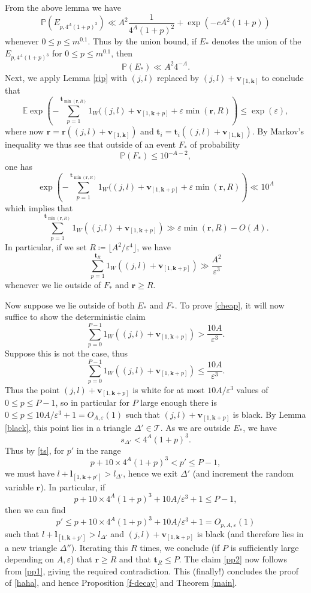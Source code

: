 \documentclass[12pt,a4paper,reqno]{amsart}
\numberwithin{equation}{section}
\theoremstyle{plain}
\theoremstyle{definition}
\renewcommand\P{\mathbb{P}}
\newcommand\E{\mathbb{E}}
\renewcommand\k{\mathbf{k}}
\renewcommand\v{\mathbf{v}}
\renewcommand\t{\mathbf{t}}
\renewcommand\r{\mathbf{r}}
\renewcommand\l{\mathbf{l}}
\newcommand\eps{\varepsilon}
\begin{document}
From the above lemma we have
$$ \P( E_{p,4^A (1+p)^3} ) \ll A^2 \frac{1}{4^A (1+p)^2} + \exp( - c A^2 (1+p) )$$
whenever $0 \leq p \leq m^{0.1}$.  Thus by the union bound, if $E_*$ denotes the union of the $E_{p,4^A (1+p)^3}$ for $0 \leq p \leq m^{0.1}$, then
$$ \P( E_*) \ll A^2 4^{-A}.$$
Next, we apply Lemma \ref{rip} with $(j,l)$ replaced by $(j,l) + \v_{[1,\k]}$ to conclude that
$$
 \E \exp\left( - \sum_{p=1}^{\t_{\min(\r,R)}} 1_W((j,l) + \v_{[1,\k+p]} + \eps \min(\r,R) \right) \leq \exp(\eps),$$
where now $\r = \r((j,l) + \v_{[1,\k]})$ and $\t_i = \t_i((j,l) + \v_{[1,\k]})$.  By Markov's inequality we thus see that outside of an event $F_*$ of probability
$$ \P( F_*) \leq 10^{-A-2},$$
one has
$$ \exp\left( - \sum_{p=1}^{\t_{\min(\r,R)}} 1_W((j,l) + \v_{[1,\k+p]} + \eps \min(\r,R) \right)  \ll 10^A$$
which implies that
$$ \sum_{p=1}^{\t_{\min(\r,R)}} 1_W((j,l) + \v_{[1,\k+p]})  \gg \eps \min(\r,R) - O( A ).$$
In particular, if we set $R \coloneqq \lfloor A^2 / \eps^4\rfloor$, we have
\begin{equation}\label{pp1}
 \sum_{p=1}^{\t_{R}} 1_W((j,l) + \v_{[1,\k+p]})  \gg \frac{A^2}{\eps^3} 
\end{equation}
whenever we lie outside of $F_*$ and $\r \geq R$.

Now suppose we lie outside of both $E_*$ and $F_*$.  To prove \eqref{cheap}, it will now suffice to show the deterministic claim
\begin{equation}\label{pp2}
 \sum_{p=0}^{P-1} 1_W((j,l) + \v_{[1,\k+p]} ) > \frac{10 A}{\eps^3}.
\end{equation}
Suppose this is not the case, thus
$$ \sum_{p=0}^{P-1} 1_W((j,l) + \v_{[1,\k+p]} ) \leq \frac{10 A}{\eps^3}.$$
Thus the point $(j,l) + \v_{[1,\k+p]}$ is white for at most $10 A/\eps^3$ values of $0 \leq p \leq P-1$, so in particular for $P$ large enough there is $0 \leq p \leq 10A/\eps^3+1 = O_{A,\eps}(1)$ such that $(j,l) + \v_{[1,\k+p]}$ is black. By Lemma \ref{black}, this point lies in a triangle $\Delta' \in {\mathcal T}$.  As we are outside $E_*$, we have 
$$ s_{\Delta'} < 4^A (1+p)^3.$$
Thus by \eqref{ts}, for $p'$ in the range
$$p + 10 \times 4^A (1+p)^3 < p' \leq P-1,$$
we must have $l + \l_{[1,\k+p']} > l_{\Delta'}$, hence we exit $\Delta'$ (and increment the random variable $\r$).  In particular, if
$$ p + 10 \times 4^A (1+p)^3 + 10 A/\eps^3 + 1 \leq P-1,$$
then we can find
$$ p' \leq p + 10 \times 4^A (1+p)^3 + 10 A/\eps^3 + 1 = O_{p,A,\eps}(1) $$
such that $l + \l_{[1,\k+p']} > l_{\Delta'}$ and $(j,l) + \v_{[1,\k+p]}$ is black (and therefore lies in a new triangle $\Delta''$).  Iterating this $R$ times, we conclude (if $P$ is sufficiently large depending on $A,\eps$) that $\r \geq R$ and that $\t_R \leq P$.  The claim \eqref{pp2} now follows from \eqref{pp1}, giving the required contradiction.  This (finally!) concludes the proof of \eqref{haha}, and hence Proposition \ref{f-decay} and Theorem \ref{main}.
\end{document}
